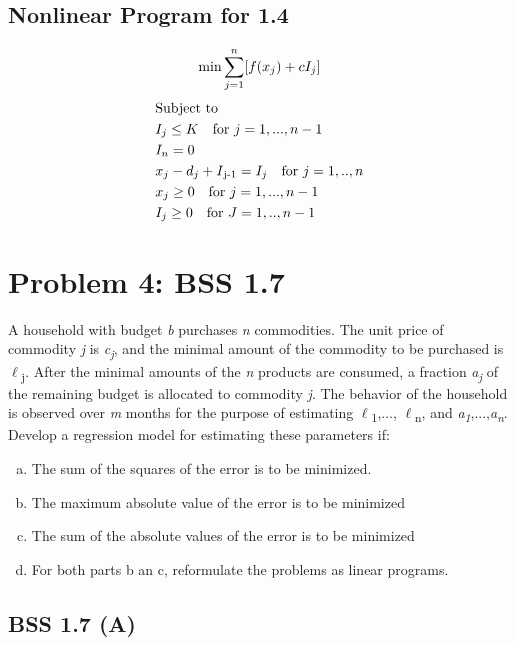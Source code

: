 \documentclass[12pt]{article}
\begin{document}
\subsection{Nonlinear Program for 1.4}
    \begin{equation*}
       \min \sum_{j=1}^{n} [f(x_j) + cI_j]\\
    \end{equation*}
       \begin{align*} 
            &\text{Subject to}\\
            &I_j \leq K \quad \text{for } j=1,...,n-1\\
            &I_n = 0\\
            &x_j - d_j + I\textsubscript{j-1} = I_j \quad \text{for } j = 1,..,n\\
            &x_j \geq 0 \quad \text{for } j=1,...,n-1\\
            &I_j \geq 0 \quad \text{for } J=1,..,n-1\\
        \end{align*}
        
\section{Problem 4: BSS 1.7}
A household with budget \textit{b} purchases \textit{n} commodities. The unit price of commodity \textit{j} is \textit{c\textsubscript{j}}, and the minimal amount of the commodity to be purchased is $\ell$\textsubscript{j}. After the minimal amounts of the \textit{n} products are consumed, a fraction \textit{a\textsubscript{j}} of the remaining budget is allocated to commodity \textit{j}. The behavior of the household is observed over \textit{m} months for the purpose of estimating $\ell$\textsubscript{1},..., $\ell$\textsubscript{n}, and \textit{a\textsubscript{1}},...,\textit{a\textsubscript{n}}. Develop a regression model for estimating these parameters if:
\begin{enumerate}[(a)]
\item The sum of the squares of the error is to be minimized.
\item The maximum absolute value of the error is to be minimized
\item The sum of the absolute values of the error is to be minimized
\item For both parts b an c, reformulate the problems as linear programs.
\end{enumerate}

\subsection{BSS 1.7 (A)}
\end{document}
